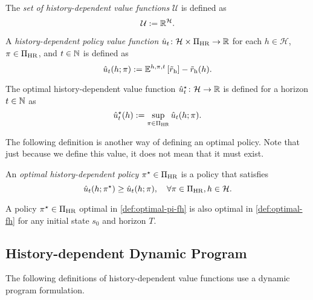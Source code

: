 \begin{definition} \label{def:values-h}
  The \emph{set of history-dependent value functions} $\mathcal{U}$ is defined as
  \[
   \mathcal{U} := \mathbb{R}^{\mathcal{H}}.
 \]
  \leanok
\end{definition}

\begin{definition} \label{def:u-pi}
A \emph{history-dependent policy value function} $\hat{u}_t\colon \mathcal{H} \times \Pi_{\mathrm{HR}} \to \mathbb{R}$ for each $h\in \mathcal{H}$, $\pi \in \Pi_{\mathrm{HR}}$, and $t\in \mathbb{N}$ is defined as
  \[
   \hat{u}_t(h; \pi) := \mathbb{E}^{h, \pi, t} \left[ \tilde{r}_{\mathrm{h}} \right] - \tilde{r}_{\mathrm{h}}(h).
 \]
  \leanok
\end{definition}


\begin{definition}
The optimal history-dependent value function $\hat{u}_t^{\star}\colon \mathcal{H} \to \mathbb{R}$ is defined for a horizon $t\in \mathbb{N}$ as
 \[
  \hat{u}^{\star}_t(h) := \sup_{\pi\in \Pi_{\mathrm{HR}}} \hat{u}_t(h; \pi). 
 \] 
\end{definition}

The following definition is another way of defining an optimal policy. Note that just because we define this value, it does not mean that it must exist. 
\begin{definition} \label{def:optimal-pi-fh}
An \emph{optimal history-dependent policy} $\pi^{\star} \in \Pi_{\mathrm{HR}}$ is a policy that satisfies
\[
   \hat{u}_t(h; \pi^{\star}) \ge \hat{u}_t(h; \pi), \quad \forall \pi \in \Pi_{\mathrm{HR}}, h\in \mathcal{H}.
 \]
 \leanok
\end{definition}

\begin{definition} \label{def:optimalvf-imp-optimal}
A policy $\pi^{\star} \in \Pi_{\mathrm{HR}}$ optimal in \cref{def:optimal-pi-fh} is also optimal in \cref{def:optimal-fh} for any initial state $s_0$ and horizon $T$.
\end{definition}

\subsection{History-dependent Dynamic Program}

The following definitions of history-dependent value functions use a dynamic program formulation.

